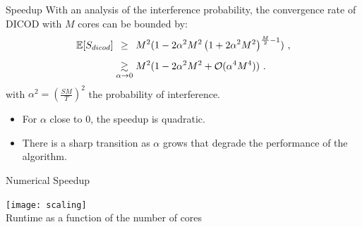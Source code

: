 \documentclass[ignorenonframetext]{beamer}
\newcommand{\smeq}{\medmuskip=0mu \thickmuskip=0mu \thinmuskip=0mu}
\begin{document}

\begin{frame}{Speedup}
With an analysis of the interference probability, the convergence rate of DICOD with $M$ cores can be bounded by:
\begin{equation}
	\label{eq:seedup}
	\begin{split}
		\mathbb E[S_{dicod}] & \underset{\phantom{\alpha \to 0}}{\ge} \smeq M^2 ( 1- 2\alpha^2M^2\left(\smeq1 +2\alpha^2M^2\right)^{\frac{M}{2}-1})~,\\
		&\smeq\underset{\alpha \to 0}{\gtrsim} M^2(1-2\alpha^2M^2 + \mathcal O(\alpha^4M^4))~.
	\end{split}
\end{equation}
with $\alpha^2 = \left(\frac{SM}{T}\right)^2$ the probability of interference.\\[.5em]
\begin{itemize}
	\item For $\alpha$ close to 0, the speedup is quadratic.
	\item There is a sharp transition as $\alpha$ grows that degrade the performance of the algorithm.
\end{itemize}
\end{frame}


\begin{frame}{Numerical Speedup}

\centering
		\texttt{[image: scaling]}\\
Runtime as a function of the number of cores

\end{frame}
\end{document}
